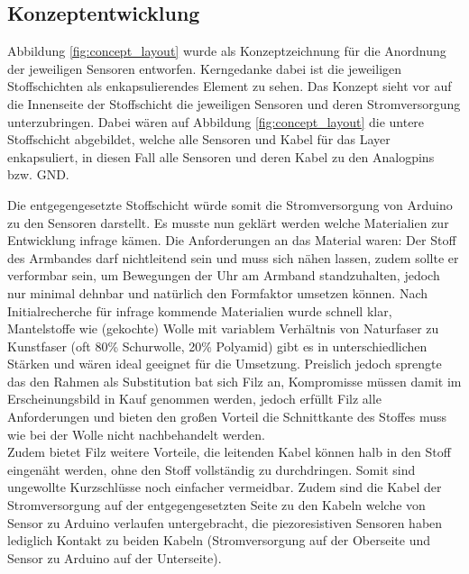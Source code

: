 \documentclass[11pt, a4paper]{article}
\begin{document}
\subsection{Konzeptentwicklung}
\label{sec:hw_proc_concept2}

Abbildung \ref{fig:concept_layout} wurde als Konzeptzeichnung für die Anordnung der jeweiligen Sensoren entworfen. 
Kerngedanke dabei ist die jeweiligen Stoffschichten als enkapsulierendes Element zu sehen.
Das Konzept sieht vor auf die Innenseite der Stoffschicht die jeweiligen Sensoren und deren Stromversorgung unterzubringen. 
Dabei wären auf  Abbildung \ref{fig:concept_layout} die untere Stoffschicht abgebildet, welche alle Sensoren und Kabel für das Layer enkapsuliert, in diesen Fall alle Sensoren und deren Kabel zu den Analogpins bzw. GND.
 
Die entgegengesetzte Stoffschicht würde somit die Stromversorgung von Arduino zu den Sensoren darstellt. 
Es musste nun geklärt werden welche Materialien zur Entwicklung infrage kämen. 
Die Anforderungen an das Material waren: Der Stoff des Armbandes darf nichtleitend sein und muss sich nähen lassen, zudem sollte er verformbar sein, um Bewegungen der Uhr am Armband standzuhalten, jedoch nur minimal dehnbar und natürlich den Formfaktor umsetzen können. 
Nach Initialrecherche für infrage kommende Materialien wurde schnell klar, Mantelstoffe wie (gekochte) Wolle mit variablem Verhältnis von Naturfaser zu Kunstfaser (oft 80\% Schurwolle, 20\% Polyamid) gibt es in unterschiedlichen Stärken und wären ideal geeignet für die Umsetzung. 
Preislich jedoch sprengte das den Rahmen als Substitution bat sich Filz an, Kompromisse müssen damit im Erscheinungsbild in Kauf genommen werden, jedoch erfüllt Filz alle Anforderungen und bieten den großen Vorteil die Schnittkante des Stoffes muss wie bei der Wolle nicht nachbehandelt werden.\\
Zudem bietet Filz weitere Vorteile, die leitenden Kabel können halb in den Stoff eingenäht werden, ohne den Stoff vollständig zu durchdringen. 
Somit sind ungewollte Kurzschlüsse noch einfacher vermeidbar. Zudem sind die Kabel der Stromversorgung auf der entgegengesetzten Seite zu den Kabeln welche von Sensor zu Arduino verlaufen untergebracht, die piezoresistiven Sensoren haben lediglich Kontakt zu beiden Kabeln (Stromversorgung auf der Oberseite und Sensor zu Arduino auf der Unterseite).
\end{document}
